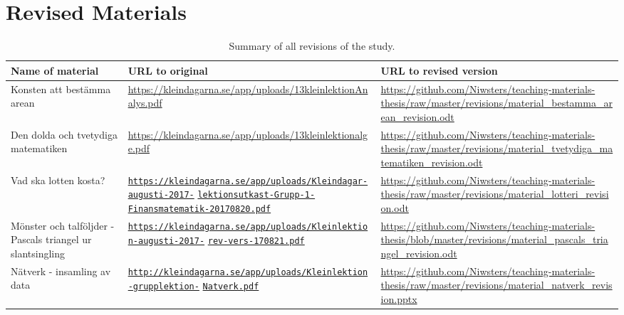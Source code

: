 \chapter{Revised Materials}

\bgroup
\def\arraystretch{1.5}
\begin{table}[H]
\begin{adjustwidth}{-2cm}{}
\centering
  \begin{tabular}{p{4.5cm}p{7cm}p{6.5cm}} \hline\hline
  \textbf{Name of material} & \textbf{URL to original} & \textbf{URL to revised version} \\ \hline
  Konsten att bestämma arean & \url{https://kleindagarna.se/app/uploads/13kleinlektionAnalys.pdf} & \url{https://github.com/Niwsters/teaching-materials-thesis/raw/master/revisions/material_bestamma_arean_revision.odt} \\ \hline
  Den dolda och tvetydiga matematiken & \url{https://kleindagarna.se/app/uploads/13kleinlektionalge.pdf} & \url{https://github.com/Niwsters/teaching-materials-thesis/raw/master/revisions/material_tvetydiga_matematiken_revision.odt} \\ \hline
  Vad ska lotten kosta? & \href{https://kleindagarna.se/app/uploads/Kleindagar-augusti-2017-lektionsutkast-Grupp-1-Finansmatematik-20170820.pdf}{\nolinkurl{https://kleindagarna.se/app/uploads/Kleindagar-augusti-2017-}} \href{https://kleindagarna.se/app/uploads/Kleindagar-augusti-2017-lektionsutkast-Grupp-1-Finansmatematik-20170820.pdf}{\nolinkurl{lektionsutkast-Grupp-1-}} \href{https://kleindagarna.se/app/uploads/Kleindagar-augusti-2017-lektionsutkast-Grupp-1-Finansmatematik-20170820.pdf}{\nolinkurl{Finansmatematik-20170820.pdf}}& \url{https://github.com/Niwsters/teaching-materials-thesis/raw/master/revisions/material_lotteri_revision.odt}\\ \hline
  Mönster och talföljder - Pascals triangel ur slantsingling & \href{https://kleindagarna.se/app/uploads/Kleinlektion-augusti-2017-rev-vers-170821.pdf}{\nolinkurl{https://kleindagarna.se/app/uploads/Kleinlektion-augusti-2017-}} \href{https://kleindagarna.se/app/uploads/Kleinlektion-augusti-2017-rev-vers-170821.pdf}{\nolinkurl{rev-vers-170821.pdf}} & \url{https://github.com/Niwsters/teaching-materials-thesis/blob/master/revisions/material_pascals_triangel_revision.odt} \\ \hline
  Nätverk - insamling av data & \href{http://kleindagarna.se/app/uploads/Kleinlektion-grupplektion-Natverk.pdf}{\nolinkurl{http://kleindagarna.se/app/uploads/Kleinlektion-grupplektion-}} \href{http://kleindagarna.se/app/uploads/Kleinlektion-grupplektion-Natverk.pdf}{\nolinkurl{Natverk.pdf}} & \url{https://github.com/Niwsters/teaching-materials-thesis/raw/master/revisions/material_natverk_revision.pptx}\\ \hline
\end{tabular}
\caption{Summary of all revisions of the study.}
\label{app:revisions}
\end{adjustwidth}
\end{table}
\egroup

